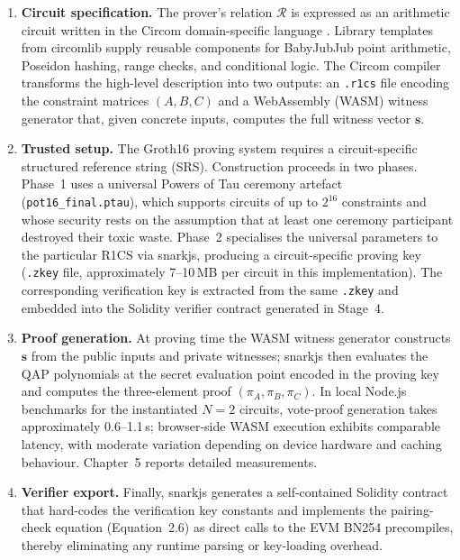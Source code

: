 \begin{enumerate}
    \item \textbf{Circuit specification.} The prover's relation $\mathcal{R}$ is expressed as an arithmetic circuit written in the Circom domain-specific language \cite{circomdocs}. Library templates from circomlib supply reusable components for BabyJubJub point arithmetic, Poseidon hashing, range checks, and conditional logic. The Circom compiler transforms the high-level description into two outputs: an \texttt{.r1cs} file encoding the constraint matrices $(A, B, C)$ and a WebAssembly (WASM) witness generator that, given concrete inputs, computes the full witness vector $\mathbf{s}$.

    \item \textbf{Trusted setup.} The Groth16 proving system requires a circuit-specific structured reference string (SRS). Construction proceeds in two phases. Phase~1 uses a universal Powers of Tau ceremony artefact (\texttt{pot16\_final.ptau}), which supports circuits of up to $2^{16}$ constraints and whose security rests on the assumption that at least one ceremony participant destroyed their toxic waste. Phase~2 specialises the universal parameters to the particular R1CS via snarkjs, producing a circuit-specific proving key (\texttt{.zkey} file, approximately 7--10\,MB per circuit in this implementation). The corresponding verification key is extracted from the same \texttt{.zkey} and embedded into the Solidity verifier contract generated in Stage~4.

    \item \textbf{Proof generation.} At proving time the WASM witness generator constructs $\mathbf{s}$ from the public inputs and private witnesses; snarkjs then evaluates the QAP polynomials at the secret evaluation point encoded in the proving key and computes the three-element proof $(\pi_A, \pi_B, \pi_C)$. In local Node.js benchmarks for the instantiated $N{=}2$ circuits, vote-proof generation takes approximately 0.6--1.1\,s; browser-side WASM execution exhibits comparable latency, with moderate variation depending on device hardware and caching behaviour. Chapter~5 reports detailed measurements.

    \item \textbf{Verifier export.} Finally, snarkjs generates a self-contained Solidity contract that hard-codes the verification key constants and implements the pairing-check equation (Equation~2.6) as direct calls to the EVM BN254 precompiles, thereby eliminating any runtime parsing or key-loading overhead.
\end{enumerate}

